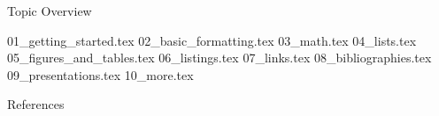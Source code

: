 



\begin{frame}{Topic Overview}
\tableofcontents
\end{frame}

{01_getting_started.tex}
{02_basic_formatting.tex}
{03_math.tex}
{04_lists.tex}
{05_figures_and_tables.tex}
{06_listings.tex}
{07_links.tex}
{08_bibliographies.tex}
{09_presentations.tex}
{10_more.tex}

\appendix
\beginbackup

\begin{frame}[allowframebreaks]{References}
\printbibliography
\end{frame}

\backupend



